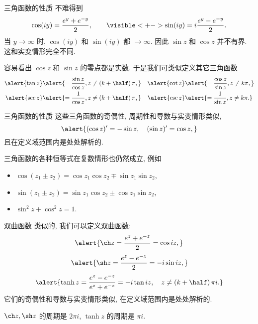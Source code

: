 \begin{frame}{三角函数的性质}
	\onslide<+->
	不难得到
	\[
		\cos(iy)=\dfrac{e^y+e^{-y}}2,\qquad
		\visible<+->{\sin(iy)=i\dfrac{e^y-e^{-y}}2.}
	\]
	\onslide<+->
	当 $y\to\infty$ 时, $\cos(iy)$ 和 $\sin(iy)$ 都 $\to\infty$.
	\onslide<+->
	因此 \alert{$\sin z$ 和 $\cos z$ 并不有界}. 
	\onslide<+->
	这和实变情形完全不同.

	\onslide<+->
	容易看出 $\cos z$ 和 $\sin z$ 的零点都是实数.
	\onslide<+->
	于是我们可类似定义其它三角函数
	\begin{align*}
		\alert{\tan z}&
		\alert{=\frac{\sin z}{\cos z},z\neq\left(k+\half\right)\pi,}&
		\alert{\cot z}&
		\alert{=\frac{\cos z}{\sin z},z\neq k\pi,}\\
		\alert{\sec z}&
		\alert{=\frac{1}{\cos z},z\neq\left(k+\half\right)\pi,}&
		\alert{\csc z}&
		\alert{=\frac{1}{\sin z},z\neq k\pi.}
	\end{align*}
\end{frame}


\begin{frame}{三角函数的性质}
	\onslide<+->
	这些三角函数的奇偶性, 周期性和导数与实变情形类似,
	\[\alert{(\cos z)'=-\sin z,\quad
	(\sin z)'=\cos z,}\]
	\onslide<+->
	且在定义域范围内是处处解析的.

	\onslide<+->
	三角函数的各种恒等式在复数情形也仍然成立,
	\onslide<+->
	例如
	\begin{itemize}
		\item $\cos(z_1\pm z_2)=\cos z_1 \cos z_2\mp \sin z_1 \sin z_2$,
		\item $\sin(z_1\pm z_2)=\sin z_1 \cos z_2\pm\cos z_1 \sin z_2$,
		\item $\sin^2z+\cos^2z=1$.
	\end{itemize}
\end{frame}


\begin{frame}{双曲函数}
	\onslide<+->
	类似的, 我们可以定义双曲函数:
	\onslide<+->
	\[\alert{\ch z=\frac{e^z+e^{-z}}2=\cos iz,}\]
	\onslide<+->
	\[\alert{\sh z=\frac{e^z-e^{-z}}2=-i\sin iz,}\]
	\onslide<+->
	\[\alert{\tanh z=\frac{e^z-e^{-z}}{e^z+e^{-z}}
	=-i\tan iz,\quad z\neq \left(k+\half\right)\pi i.}\]
	\onslide<+->
	它们的奇偶性和导数与实变情形类似, 在定义域范围内是处处解析的.

	\onslide<+->
	$\ch z,\sh z$ 的周期是 $2\pi i$, $\tanh z$ 的周期是 $\pi i$.
\end{frame}


